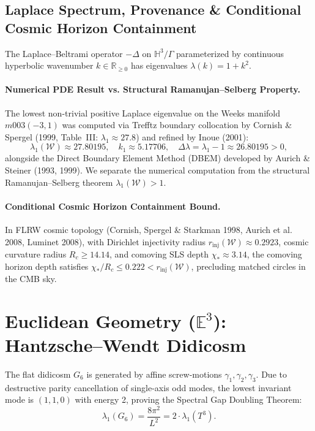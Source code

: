 \documentclass[11pt,a4paper]{article}
\begin{document}
\subsection{Laplace Spectrum, Provenance \& Conditional Cosmic Horizon Containment}
The Laplace--Beltrami operator $-\Delta$ on $\mathbb{H}^3/\Gamma$ parameterized by continuous hyperbolic wavenumber $k \in \mathbb{R}_{\ge 0}$ has eigenvalues $\lambda(k) = 1 + k^2$. 

\paragraph{Numerical PDE Result vs. Structural Ramanujan--Selberg Property.}
The lowest non-trivial positive Laplace eigenvalue on the Weeks manifold $m003(-3,1)$ was computed via Trefftz boundary collocation by Cornish \& Spergel (1999, Table~III: $\lambda_1 \approx 27.8$) and refined by Inoue (2001):
\begin{equation}
\lambda_1(\mathcal{W}) \approx 27.80195, \quad k_1 \approx 5.17706, \quad \Delta\lambda = \lambda_1 - 1 \approx 26.80195 > 0,
\end{equation}
alongside the Direct Boundary Element Method (DBEM) developed by Aurich \& Steiner (1993, 1999). We separate the numerical computation from the structural Ramanujan--Selberg theorem $\lambda_1(\mathcal{W}) > 1$.

\paragraph{Conditional Cosmic Horizon Containment Bound.}
In FLRW cosmic topology (Cornish, Spergel \& Starkman 1998, Aurich et al. 2008, Luminet 2008), with Dirichlet injectivity radius $r_{\mathrm{inj}}(\mathcal{W}) \approx 0.2923$, cosmic curvature radius $R_c \ge 14.14$, and comoving SLS depth $\chi_\ast \approx 3.14$, the comoving horizon depth satisfies $\chi_\ast / R_c \le 0.222 < r_{\mathrm{inj}}(\mathcal{W})$, precluding matched circles in the CMB sky.

\section{Euclidean Geometry ($\mathbb{E}^3$): Hantzsche--Wendt Didicosm}
The flat didicosm $G_6$ is generated by affine screw-motions $\gamma_1, \gamma_2, \gamma_3$. Due to destructive parity cancellation of single-axis odd modes, the lowest invariant mode is $(1,1,0)$ with energy 2, proving the Spectral Gap Doubling Theorem:
\begin{equation}
\lambda_1(G_6) = \frac{8\pi^2}{L^2} = 2 \cdot \lambda_1(T^3).
\end{equation}
\end{document}
